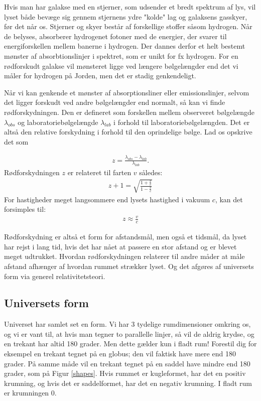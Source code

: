 Hvis man har galakse med en stjerner, som udsender et bredt spektrum af lys, vil lyset både bevæge sig gennem stjernens ydre "kolde" lag og galaksens gasskyer, før det når os. Stjerner og skyer består af forskellige stoffer såsom hydrogen. Når de belyses, absorberer hydrogenet fotoner med de energier, der svarer til energiforskellen mellem banerne i hydrogen. Der dannes derfor et helt bestemt mønster af absorbtionslinjer i spektret, som er unikt for fx hydrogen. For en rødforskudt galakse vil mønsteret ligge ved længere bølgelængder end det vi måler for hydrogen på Jorden, men det er stadig genkendeligt.

Når vi kan genkende et mønster af absorptionsliner eller emissionslinjer, selvom det ligger forskudt ved andre bølgelængder end normalt, så kan vi finde rødforskydningen. Den er defineret som forskellen mellem observeret bølgelængde $\lambda_{obs}$ og laboratoriebølgelængde $\lambda_{lab}$ i forhold til laboratoriebølgelængden. Det er altså den relative forskydning i forhold til den oprindelige bølge. Lad os opskrive det som

\begin{align}
z=\frac{\lambda_{obs}-\lambda_{lab}}{\lambda_{lab}}.
\end{align}
Rødforskydningen $z$ er relateret til farten $v$ således:
\begin{align}
z+1=\sqrt{\frac{1+\frac{v}{c}}{1-\frac{v}{c}}}
\end{align}
For hastigheder meget langsommere end lysets hastighed i vakuum $c$, kan det forsimples til:
\begin{align}
z\approx\frac{v}{c}
\end{align}

Rødforskydning er altså et form for afstandsmål, men også et tidsmål, da lyset har rejst i lang tid, hvis det har nået at passere en stor afstand og er blevet meget udtrukket. Hvordan rødforskydningen relaterer til andre måder at måle afstand afhænger af hvordan rummet strækker lyset. Og det afgøres af universets form via generel relativitetsteori.

\subsection{Universets form}

Universet har samlet set en form. Vi har 3 tydelige rumdimensioner omkring os, og vi er vant til, at hvis man tegner to parallelle linjer, så vil de aldrig krydse, og en trekant har altid 180 grader. Men dette gælder kun i fladt rum! Forestil dig for eksempel en trekant tegnet på en globus; den vil faktisk have mere end 180 grader. På samme måde vil en trekant tegnet på en saddel have mindre end 180 grader, som på Figur \ref{shapes}. Hvis rummet er kugleformet, har det en positiv krumning, og hvis det er saddelformet, har det en negativ krumning. I fladt rum er krumningen 0.

